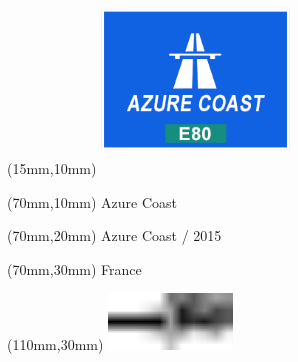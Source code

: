 \null\newpage
\begin{textblock*}{50mm}(15mm,10mm)%
\includegraphics[width=50mm]{LG/AZO.png}
\end{textblock*}
\begin{textblock*}{130mm}(70mm,10mm)%
{\fontsize{20}{20}\selectfont Azure Coast}\\
\end{textblock*}
\begin{textblock*}{120mm}(70mm,20mm)%
{\fontsize{16}{16}\selectfont Azure Coast / 2015}\\
\end{textblock*}
\begin{textblock*}{120mm}(70mm,30mm)%
{\fontsize{12}{12}\selectfont France}
\end{textblock*}
\begin{textblock*}{30mm}(110mm,30mm)%
\centering
\includegraphics[height=15mm]{icons/tofinish.pdf}
\end{textblock*}
